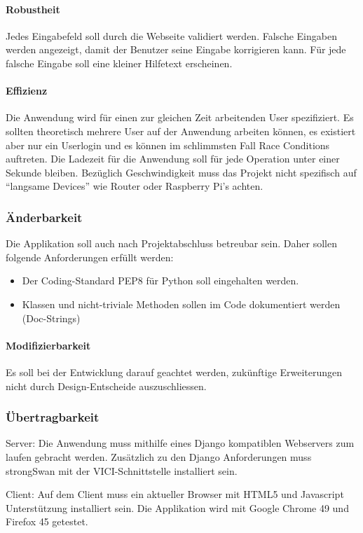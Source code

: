 \paragraph{Robustheit}
Jedes Eingabefeld soll durch die Webseite validiert werden. Falsche Eingaben werden angezeigt, damit der Benutzer seine Eingabe korrigieren kann. Für jede falsche Eingabe soll eine kleiner Hilfetext erscheinen.

\paragraph{Effizienz}
Die Anwendung wird für einen zur gleichen Zeit arbeitenden User spezifiziert. Es sollten theoretisch mehrere User auf der Anwendung arbeiten können, es existiert aber nur ein Userlogin und es können im schlimmsten Fall Race Conditions auftreten.
Die Ladezeit für die Anwendung soll für jede Operation unter einer Sekunde bleiben. Bezüglich Geschwindigkeit muss das Projekt nicht spezifisch auf “langsame Devices” wie Router oder Raspberry Pi's achten.

\subsubsection{Änderbarkeit}
Die Applikation soll auch nach Projektabschluss betreubar sein. Daher sollen folgende Anforderungen erfüllt werden: 
\begin{itemize}
	\item Der Coding-Standard PEP8 für Python soll eingehalten werden.
	\item Klassen und nicht-triviale Methoden sollen im Code dokumentiert werden (Doc-Strings)
\end{itemize}

\paragraph{Modifizierbarkeit}
Es soll bei der Entwicklung darauf geachtet werden, zukünftige Erweiterungen nicht durch Design-Entscheide auszuschliessen.


\subsubsection{Übertragbarkeit}
Server: Die Anwendung muss mithilfe eines Django kompatiblen Webservers zum laufen gebracht werden. Zusätzlich zu den Django Anforderungen muss strongSwan mit der VICI-Schnittstelle installiert sein.

Client: Auf dem Client muss ein aktueller Browser mit HTML5 und Javascript Unterstützung installiert sein. Die Applikation wird mit Google Chrome 49 und Firefox 45 getestet.



